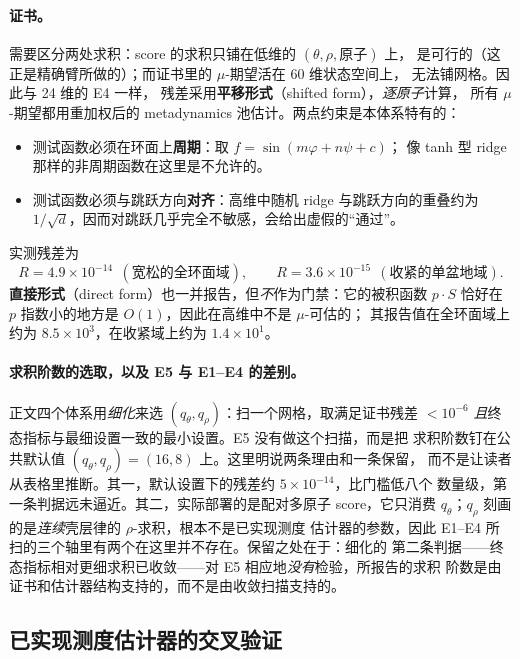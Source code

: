 \documentclass[11pt,a4paper]{article}
\begin{document}
\paragraph{证书。}
需要区分两处求积：score 的求积只铺在低维的 $(\theta,\rho,\text{原子})$ 上，
是可行的（这正是精确臂所做的）；而证书里的 $\mu$-期望活在 $60$ 维状态空间上，
无法铺网格。因此与 24 维的 E4 一样，
残差采用\textbf{平移形式}（shifted form），\emph{逐原子}计算，
所有 $\mu$-期望都用重加权后的 metadynamics 池估计。两点约束是本体系特有的：
\begin{itemize}
 \item 测试函数必须在环面上\textbf{周期}：取 $f=\sin(m\varphi+n\psi+c)$；
 像 tanh 型 ridge 那样的非周期函数在这里是不允许的。
 \item 测试函数必须与跳跃方向\textbf{对齐}：高维中随机 ridge 与跳跃方向的重叠约为
 $1/\sqrt{d}$，因而对跳跃几乎完全不敏感，会给出虚假的“通过”。
\end{itemize}
实测残差为
\begin{equation}
 R=4.9\times10^{-14}\ \ (\text{宽松的全环面域}),
 \qquad
 R=3.6\times10^{-15}\ \ (\text{收紧的单盆地域}).
\end{equation}
\textbf{直接形式}（direct form）也一并报告，但\emph{不}作为门禁：它的被积函数
$p\cdot S$ 恰好在 $p$ 指数小的地方是 $O(1)$，因此在高维中不是 $\mu$-可估的；
其报告值在全环面域上约为 $8.5\times10^{3}$，在收紧域上约为 $1.4\times10^{1}$。

\paragraph{求积阶数的选取，以及 E5 与 E1--E4 的差别。}
正文四个体系用\emph{细化}来选 $(q_\theta,q_\rho)$：扫一个网格，取满足证书残差
$<10^{-6}$ \emph{且}终态指标与最细设置一致的最小设置。E5 没有做这个扫描，而是把
求积阶数钉在公共默认值 $(q_\theta,q_\rho)=(16,8)$ 上。这里明说两条理由和一条保留，
而不是让读者从表格里推断。其一，默认设置下的残差约 $5\times10^{-14}$，比门槛低八个
数量级，第一条判据远未逼近。其二，实际部署的是配对多原子 score，它只消费
$q_\theta$；$q_\rho$ 刻画的是\emph{连续}壳层律的 $\rho$-求积，根本不是已实现测度
估计器的参数，因此 E1--E4 所扫的三个轴里有两个在这里并不存在。保留之处在于：细化的
第二条判据——终态指标相对更细求积已收敛——对 E5 相应地\emph{没有}检验，所报告的求积
阶数是由证书和估计器结构支持的，而不是由收敛扫描支持的。

\subsection{已实现测度估计器的交叉验证}
\end{document}
